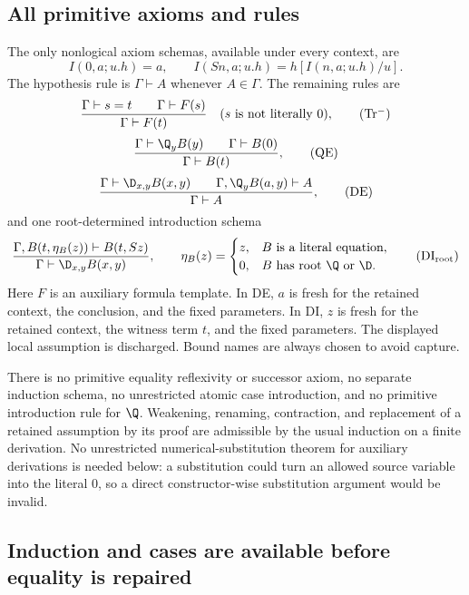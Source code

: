 \subsection{All primitive axioms and rules}

The only nonlogical axiom schemas, available under every context, are
\[
 I(0,a;u.h)=a,\qquad
 I(Sn,a;u.h)=h[I(n,a;u.h)/u].
 \tag{I0,IS}
\]
The hypothesis rule is $\Gamma\vdash A$ whenever $A\in\Gamma$.
The remaining rules are
\[
 \frac{\Gamma\vdash s=t\qquad\Gamma\vdash F(s)}
      {\Gamma\vdash F(t)}
 \quad(s\text{ is not literally }0),
 \tag{Tr$^{-}$}\label{eq:restricted-tr}
\]
\[
 \frac{\Gamma\vdash\Q_y B(y)\qquad\Gamma\vdash B(0)}
      {\Gamma\vdash B(t)},
 \tag{QE}
\]
\[
 \frac{\Gamma\vdash\D_{x,y}B(x,y)\qquad
       \Gamma,\Q_yB(a,y)\vdash A}
      {\Gamma\vdash A},
 \tag{DE}
\]
and one root-determined introduction schema
\begin{equation}
 \frac{\Gamma,B(t,\eta_B(z))\vdash B(t,Sz)}
      {\Gamma\vdash\D_{x,y}B(x,y)},\qquad
 \eta_B(z)=
 \begin{cases}
 z,&B\text{ is a literal equation},\\
 0,&B\text{ has root }\Q\text{ or }\D.
 \end{cases}
 \tag{DI$_{\rm root}$}\label{eq:root-di}
\end{equation}
Here $F$ is an auxiliary formula template.  In DE, $a$ is fresh for the
retained context, the conclusion, and the fixed parameters.  In DI,
$z$ is fresh for the retained context, the witness term $t$, and the
fixed parameters.  The displayed local assumption is discharged.
Bound names are always chosen to avoid capture.

There is no primitive equality reflexivity or successor axiom, no
separate induction schema, no unrestricted atomic case introduction,
and no primitive introduction rule for $\Q$.  Weakening, renaming,
contraction, and replacement of a retained assumption by its proof are
admissible by the usual induction on a finite derivation.  No unrestricted
numerical-substitution theorem for auxiliary derivations is needed below:
a substitution could turn an allowed source variable into the literal
$0$, so a direct constructor-wise substitution argument would be invalid.

\subsection{Induction and cases are available before equality is repaired}

